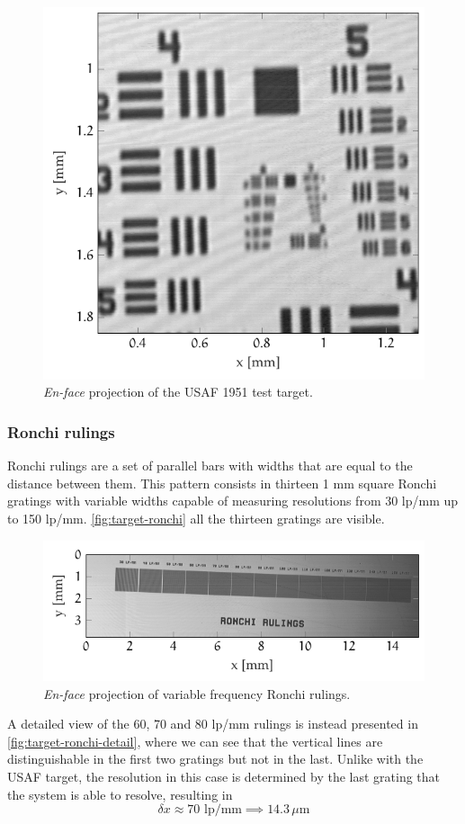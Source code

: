 \begin{figure}[hbt]
	\centering
	\includegraphics[width=0.6\linewidth]{gfx/ch4/axsun/target/usaf}
	\caption{\emph{En-face} projection of the USAF 1951 test target.}\label{fig:target-usaf}
\end{figure}

\subsubsection{Ronchi rulings}
Ronchi rulings are a set of parallel bars with widths that are equal to the distance between them. This pattern consists in thirteen 1 mm square Ronchi gratings with variable widths capable of measuring resolutions from 30 lp/mm up to 150 lp/mm. \autoref{fig:target-ronchi} all the thirteen gratings are visible. 

\begin{figure}[hbt]
	\centering
	\includegraphics[width=1\linewidth]{gfx/ch4/axsun/target/ronchi-full}
	\caption{\emph{En-face} projection of variable frequency Ronchi rulings.}\label{fig:target-ronchi}
\end{figure}




A detailed view of the 60, 70 and 80 lp/mm rulings is instead presented in \autoref{fig:target-ronchi-detail}, where we can see that the vertical lines are distinguishable in the first two gratings but not in the last. Unlike with the USAF target, the resolution in this case is determined by the last grating that the system is able to resolve, resulting in
\begin{equation}
\delta x \approx 70 \text{ lp/mm} \implies 14.3\, \mu\text{m}
\end{equation}


